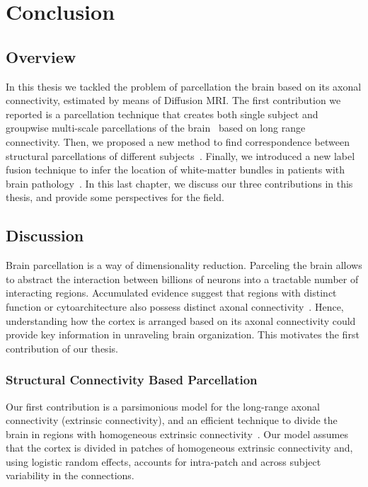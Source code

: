 \chapter{Conclusion}

\section{Overview}
In this thesis we tackled the problem of parcellation the brain based on its axonal
connectivity, estimated by means of Diffusion MRI. The first contribution we reported
is a parcellation
technique that creates both single subject and groupwise multi-scale parcellations
of the brain~\cite{Gallardo2017a} based on long range connectivity. Then, we proposed
a new method to find correspondence between structural parcellations of different 
subjects~\cite{Gallardo2018}. Finally, we introduced a new label fusion technique
to infer the location of  white-matter bundles in patients with brain pathology~\cite{Guillermo2018}.
In this last chapter, we discuss our three contributions in this thesis,
and provide some perspectives for the field.

\section{Discussion}
Brain parcellation is a way of dimensionality reduction. Parceling the brain
allows to abstract the interaction between billions of neurons into a tractable
number of interacting regions. Accumulated evidence suggest that regions with
distinct function or cytoarchitecture also possess distinct axonal connectivity~\citep{Passingham2002, Johansen-Berg2004, Honey2009, Eickhoff2010}.
Hence, understanding how the cortex is arranged based on its axonal connectivity
could provide key information in unraveling brain organization. This motivates
the first contribution of our thesis.

\subsection{Structural Connectivity Based Parcellation}
Our first contribution is a parsimonious model for the long-range axonal
connectivity (extrinsic connectivity), and an efficient technique to divide the
brain in regions with homogeneous extrinsic connectivity~\cite{Gallardo2017a}.
Our model assumes that the cortex is divided in patches of homogeneous extrinsic
connectivity and, using logistic random effects, accounts for intra-patch and
across subject variability in the connections.

